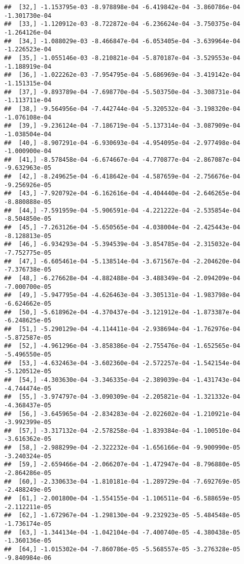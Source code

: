 \documentclass[
]{article}
\begin{document}
\begin{verbatim}
##  [32,] -1.153795e-03 -8.978898e-04 -6.419842e-04 -3.860786e-04 -1.301730e-04
##  [33,] -1.120912e-03 -8.722872e-04 -6.236624e-04 -3.750375e-04 -1.264126e-04
##  [34,] -1.088029e-03 -8.466847e-04 -6.053405e-04 -3.639964e-04 -1.226523e-04
##  [35,] -1.055146e-03 -8.210821e-04 -5.870187e-04 -3.529553e-04 -1.188919e-04
##  [36,] -1.022262e-03 -7.954795e-04 -5.686969e-04 -3.419142e-04 -1.151315e-04
##  [37,] -9.893789e-04 -7.698770e-04 -5.503750e-04 -3.308731e-04 -1.113711e-04
##  [38,] -9.564956e-04 -7.442744e-04 -5.320532e-04 -3.198320e-04 -1.076108e-04
##  [39,] -9.236124e-04 -7.186719e-04 -5.137314e-04 -3.087909e-04 -1.038504e-04
##  [40,] -8.907291e-04 -6.930693e-04 -4.954095e-04 -2.977498e-04 -1.000900e-04
##  [41,] -8.578458e-04 -6.674667e-04 -4.770877e-04 -2.867087e-04 -9.632963e-05
##  [42,] -8.249625e-04 -6.418642e-04 -4.587659e-04 -2.756676e-04 -9.256926e-05
##  [43,] -7.920792e-04 -6.162616e-04 -4.404440e-04 -2.646265e-04 -8.880888e-05
##  [44,] -7.591959e-04 -5.906591e-04 -4.221222e-04 -2.535854e-04 -8.504850e-05
##  [45,] -7.263126e-04 -5.650565e-04 -4.038004e-04 -2.425443e-04 -8.128813e-05
##  [46,] -6.934293e-04 -5.394539e-04 -3.854785e-04 -2.315032e-04 -7.752775e-05
##  [47,] -6.605461e-04 -5.138514e-04 -3.671567e-04 -2.204620e-04 -7.376738e-05
##  [48,] -6.276628e-04 -4.882488e-04 -3.488349e-04 -2.094209e-04 -7.000700e-05
##  [49,] -5.947795e-04 -4.626463e-04 -3.305131e-04 -1.983798e-04 -6.624662e-05
##  [50,] -5.618962e-04 -4.370437e-04 -3.121912e-04 -1.873387e-04 -6.248625e-05
##  [51,] -5.290129e-04 -4.114411e-04 -2.938694e-04 -1.762976e-04 -5.872587e-05
##  [52,] -4.961296e-04 -3.858386e-04 -2.755476e-04 -1.652565e-04 -5.496550e-05
##  [53,] -4.632463e-04 -3.602360e-04 -2.572257e-04 -1.542154e-04 -5.120512e-05
##  [54,] -4.303630e-04 -3.346335e-04 -2.389039e-04 -1.431743e-04 -4.744474e-05
##  [55,] -3.974797e-04 -3.090309e-04 -2.205821e-04 -1.321332e-04 -4.368437e-05
##  [56,] -3.645965e-04 -2.834283e-04 -2.022602e-04 -1.210921e-04 -3.992399e-05
##  [57,] -3.317132e-04 -2.578258e-04 -1.839384e-04 -1.100510e-04 -3.616362e-05
##  [58,] -2.988299e-04 -2.322232e-04 -1.656166e-04 -9.900990e-05 -3.240324e-05
##  [59,] -2.659466e-04 -2.066207e-04 -1.472947e-04 -8.796880e-05 -2.864286e-05
##  [60,] -2.330633e-04 -1.810181e-04 -1.289729e-04 -7.692769e-05 -2.488249e-05
##  [61,] -2.001800e-04 -1.554155e-04 -1.106511e-04 -6.588659e-05 -2.112211e-05
##  [62,] -1.672967e-04 -1.298130e-04 -9.232923e-05 -5.484548e-05 -1.736174e-05
##  [63,] -1.344134e-04 -1.042104e-04 -7.400740e-05 -4.380438e-05 -1.360136e-05
##  [64,] -1.015302e-04 -7.860786e-05 -5.568557e-05 -3.276328e-05 -9.840984e-06

\end{verbatim}
\end{document}
